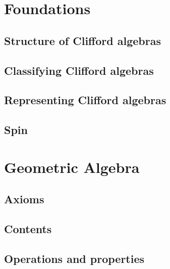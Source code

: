 \maketitle





\section{Foundations}
\label{cha:foundations}




\subsection{Structure of Clifford algebras}

\subsection{Classifying Clifford algebras}

\subsection{Representing Clifford algebras}

\subsection{Spin}

\section{Geometric Algebra}

\subsection{Axioms}

\subsection{Contents}



\subsection{Operations and properties}

